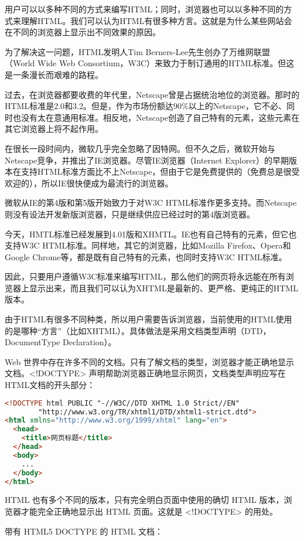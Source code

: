 用户可以以多种不同的方式来编写HTML；同时，浏览器也可以以多种不同的方式来理解HTML。我们可以认为HTML有很多种方言。这就是为什么某些网站会在不同的浏览器上显示出不同效果的原因。

为了解决这一问题，HTML发明人Tim Berners-Lee先生创办了万维网联盟（World Wide Web Consortium，W3C）来致力于制订通用的HTML标准。但这是一条漫长而艰难的路程。

过去，在浏览器都要收费的年代里，Netscape曾是占据统治地位的浏览器。那时的HTML标准是2.0和3.2。但是，作为市场份额达90\%以上的Netscape，它不必、同时也没有太在意通用标准。相反地，Netscape创造了自己特有的元素，这些元素在其它浏览器上将不起作用。

在很长一段时间内，微软几乎完全忽略了因特网。但不久之后，微软开始与Netscape竞争，并推出了IE浏览器。尽管IE浏览器（Internet Explorer）的早期版本在支持HTML标准方面比不上Netscape，但由于它是免费提供的（免费总是很受欢迎的），所以IE很快便成为最流行的浏览器。

微软从IE的第4版和第5版开始致力于对W3C HTML标准作更多支持。而Netscape则没有设法开发新版浏览器，只是继续供应已经过时的第4版浏览器。

今天，HMTL标准已经发展到4.01版和XHMTL。IE也有自己特有的元素，但它也支持W3C HTML标准。同样地，其它的浏览器，比如Mozilla Firefox、Opera和Google Chrome等，都是既有自己特有的元素，也同时支持W3C HTML标准。

因此，只要用户遵循W3C标准来编写HTML，那么他们的网页将永远能在所有浏览器上显示出来，而且我们可以认为XHTML是最新的、更严格、更纯正的HTML版本。


由于HTML有很多不同种类，所以用户需要告诉浏览器，当前使用的HTML使用的是哪种“方言”（比如XHTML）。具体做法是采用文档类型声明（DTD，DocumentType Declaration）。


Web 世界中存在许多不同的文档。只有了解文档的类型，浏览器才能正确地显示文档。<!DOCTYPE> 声明帮助浏览器正确地显示网页，文档类型声明应写在HTML文档的开头部分：

\begin{lstlisting}[language=HTML]
<!DOCTYPE html PUBLIC "-//W3C//DTD XHTML 1.0 Strict//EN" 
		"http://www.w3.org/TR/xhtml1/DTD/xhtml1-strict.dtd">
<html xmlns="http://www.w3.org/1999/xhtml" lang="en">
  <head>
    <title>网页标题</title>
  </head>
  <body>
    ...
  </body>
</html>
\end{lstlisting}

HTML 也有多个不同的版本，只有完全明白页面中使用的确切 HTML 版本，浏览器才能完全正确地显示出 HTML 页面。这就是 <!DOCTYPE> 的用处。

带有 HTML5 DOCTYPE 的 HTML 文档：

